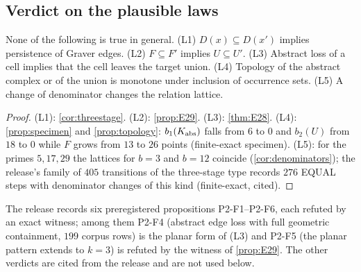 \subsection{Verdict on the plausible laws}
\begin{theorem}\label{thm:laws}
None of the following is true in general. (L1) $D(x)\subseteq D(x')$ implies persistence of Graver edges. (L2) $F\subseteq F'$ implies $U\subseteq U'$. (L3) Abstract loss of a cell implies that the cell leaves the target union. (L4) Topology of the abstract complex or of the union is monotone under inclusion of occurrence sets. (L5) A change of denominator changes the relation lattice.
\end{theorem}
\begin{proof}
(L1): \cref{cor:threestage}. (L2): \cref{prop:E29}. (L3): \cref{thm:E28}. (L4): \cref{prop:specimen} and \cref{prop:topology}: $b_1(K_{\mathrm{abs}})$ falls from $6$ to $0$ and $b_2(U)$ from $18$ to $0$ while $F$ grows from $13$ to $26$ points (finite-exact specimen). (L5): for the primes $5,17,29$ the lattices for $b=3$ and $b=12$ coincide (\cref{cor:denominators}); the release's family of $405$ transitions of the three-stage type records $276$ EQUAL steps with denominator changes of this kind (finite-exact, cited). \qedhere
\end{proof}
The release records six preregistered propositions P2-F1--P2-F6, each refuted by an exact witness; among them P2-F4 (abstract edge loss with full geometric containment, $199$ corpus rows) is the planar form of (L3) and P2-F5 (the planar pattern extends to $k=3$) is refuted by the witness of \cref{prop:E29}. The other verdicts are cited from the release and are not used below.
